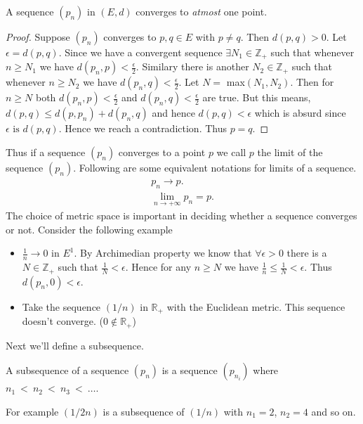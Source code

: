 \begin{Proposition}[name= Uniqueness of limit of a convergent sequence]
    A sequence $\left( p_n \right)$ in $(E,d)$ converges to \emph{atmost} one point.
\end{Proposition}
\begin{proof}
    Suppose $\left( p_n \right)$ converges to $p,q \in E$ with $p \neq q$. Then $d(p,q) > 0$. Let
    $\epsilon = d(p,q)$. Since we have a convergent sequence $\exists N_1 \in \mathbb{Z}_+$ such
    that whenever $n \geq N_1$ we have $d(p_n,p) < \frac{\epsilon}{2}$. Similary there is another
    $N_2 \in \mathbb{Z}_+$ such that whenever $n \geq N_2$ we have $d(p_n,q) < \frac{\epsilon}{2}$.
    Let $N =$ max$(N_1,N_2)$. Then for $n \geq N$ both $d(p_n,p) < \frac{\epsilon}{2}$ and 
    $d(p_n,q) < \frac{\epsilon}{2}$ are true. But this means, $d(p,q) \leq d(p,p_n) + d(p_n,q)$ and
    hence $d(p,q) < \epsilon$ which is absurd since $\epsilon \text{ is } d(p,q)$. Hence we reach a
    contradiction. Thus $p = q$.
\end{proof}

Thus if a sequence $\left( p_n \right)$ converges to a point $p$ we call $p$ the limit of the
sequence $\left( p_n \right)$. Following are some equivalent notations for limits of a sequence.
\begin{displaymath}
    \begin{aligned}
	p_n \rightarrow p. \\
	\lim_{n \to +\infty}p_n = p.
    \end{aligned}
\end{displaymath}
The choice of metric space is important in deciding whether a sequence converges or not. 
Consider the following example
\begin{itemize}
    \item $\frac{1}{n} \rightarrow 0$ in $E^1$.
    By Archimedian property we know that $\forall \epsilon > 0$ there is a $N \in \mathbb{Z}_+$ such
    that $\frac{1}{N} < \epsilon$. Hence for any $ n \geq N$ we have $\frac{1}{n} \leq \frac{1}{N} <
    \epsilon$. Thus $d(p_n,0) < \epsilon$.
\item Take the sequence $\left(1/n\right)$ in $\mathbb{R}_+$ with the Euclidean metric. This
    sequence doesn't converge. ($0 \not \in \mathbb{R}_+$)
\end{itemize}
Next we'll define a subsequence. 
\begin{Definition}
    A subsequence of a sequence $\left( p_n \right)$ is a sequence $\left( p_{n_i}
    \right)$ where $ n_1 \ < \ n_2 \ < \ n_3 \ < \ \dots $.
\end{Definition}
For example $\left( 1/2n \right)$ is a subsequence of $\left( 1/n \right)$ with $n_1 = 2$, $n_2 = 4$
and so on. 

